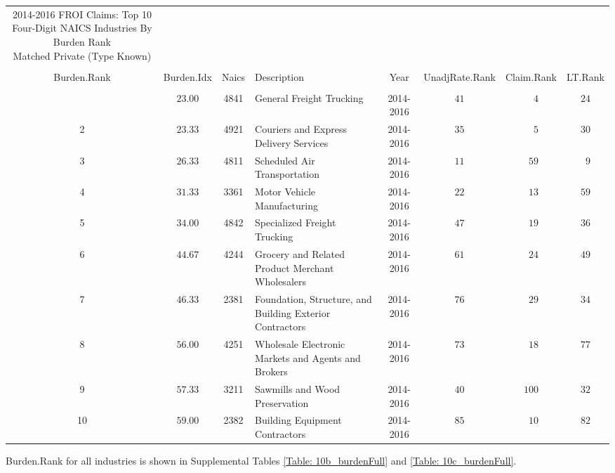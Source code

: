 \documentclass[9pt, oneside]{article}   	%
\begin{document}
\begin{longtable}{cccp{3in}cccc}
\caption{2014-2016 FROI Claims: Top 10 Four-Digit NAICS Industries By Burden Rank\\ Matched Private (Type Known)}\\ 
\label{Table: 10c_burden}\\
\hline
\toprule
 Burden.Rank & Burden.Idx & Naics & Description & Year & UnadjRate.Rank & Claim.Rank & \multicolumn{1}{c}{LT.Rank} \\ 
   \midrule\\ [-1\normalbaselineskip]\hline\endhead\hline\endfoot
1  & $23.00$ & 4841 & General Freight Trucking & 2014-2016 & $41$ & $\phantom{00}4$ & $24$ \\
2  & $23.33$ & 4921 & Couriers and Express Delivery Services & 2014-2016 & $35$ & $\phantom{00}5$ & $30$ \\
3  & $26.33$ & 4811 & Scheduled Air Transportation & 2014-2016 & $11$ & $\phantom{0}59$ & $\phantom{0}9$ \\
4  & $31.33$ & 3361 & Motor Vehicle Manufacturing & 2014-2016 & $22$ & $\phantom{0}13$ & $59$ \\
5  & $34.00$ & 4842 & Specialized Freight Trucking & 2014-2016 & $47$ & $\phantom{0}19$ & $36$ \\
6  & $44.67$ & 4244 & Grocery and Related Product Merchant Wholesalers & 2014-2016 & $61$ & $\phantom{0}24$ & $49$ \\
7  & $46.33$ & 2381 & Foundation, Structure, and Building Exterior Contractors & 2014-2016 & $76$ & $\phantom{0}29$ & $34$ \\
8  & $56.00$ & 4251 & Wholesale Electronic Markets and Agents and Brokers & 2014-2016 & $73$ & $\phantom{0}18$ & $77$ \\
9  & $57.33$ & 3211 & Sawmills and Wood Preservation & 2014-2016 & $40$ & $100$ & $32$ \\
10  & $59.00$ & 2382 & Building Equipment Contractors & 2014-2016 & $85$ & $\phantom{0}10$ & $82$ \\
\hline 
\cline{1-1} \cline{2-2} \cline{3-3} \cline{4-4} \cline{5-5}  \cline{6-6} \cline{7-7} \cline{8-8}%
\hline 
\end{longtable}

Burden.Rank for all industries is shown in Supplemental Tables \ref{Table: 10b_burdenFull} and \ref{Table: 10c_burdenFull}.
\end{document}
